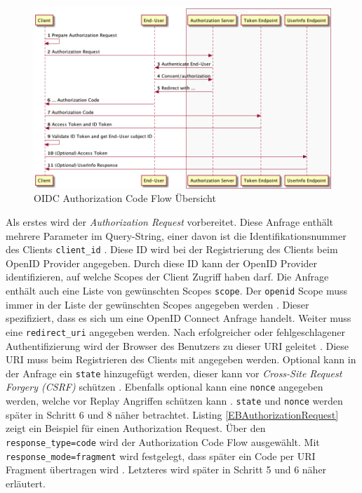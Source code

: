 \begin{figure}[!ht]
	\centering
	\includegraphics[width=1\textwidth]{Images/EbertScherer/AuthorizationCodeFlow.png}
	\caption{OIDC Authorization Code Flow Übersicht \cite{EB12}}
	\label{fig:EB_AuthorizationCodeFlow}
\end{figure} 

Als erstes wird der \textit{Authorization Request} vorbereitet. Diese Anfrage enthält mehrere Parameter im Query-String, einer davon ist die Identifikationsnummer des Clients \texttt{client\_id} \cite[Authentication Request]{EB4}. Diese ID wird bei der Registrierung des Clients beim OpenID Provider angegeben. Durch diese ID kann der OpenID Provider identifizieren, auf welche Scopes der Client Zugriff haben darf. Die Anfrage enthält auch eine Liste von gewünschten Scopes \texttt{scope}. Der \texttt{openid} Scope muss immer in der Liste der gewünschten Scopes angegeben werden \cite[Authentication Request]{EB4}. Dieser spezifiziert, dass es sich um eine OpenID Connect Anfrage handelt. Weiter muss eine \texttt{redirect\_uri} angegeben werden. Nach erfolgreicher oder fehlgeschlagener Authentifizierung wird der Browser des Benutzers zu dieser URI geleitet \cite[Authentication Request]{EB4}. Diese URI muss beim Registrieren des Clients mit angegeben werden. Optional kann in der Anfrage ein \texttt{state} hinzugefügt werden, dieser kann vor \textit{Cross-Site Request Forgery (CSRF)} schützen \cite[Authentication Request]{EB4}. Ebenfalls optional kann eine \texttt{nonce} angegeben werden, welche vor Replay Angriffen schützen kann \cite[Authentication Request]{EB4}. \texttt{state} und \texttt{nonce} werden später in Schritt 6 und 8 näher betrachtet. Listing \ref{EBAuthorizationRequest} zeigt ein Beispiel für einen Authorization Request. Über den \texttt{response\_type=code} wird der Authorization Code Flow ausgewählt. Mit \texttt{response\_mode=fragment} wird festgelegt, dass später ein Code per URI Fragment übertragen wird \cite[JavaScript Adapter Reference]{EB26}. Letzteres wird später in Schritt 5 und 6 näher erläutert.


